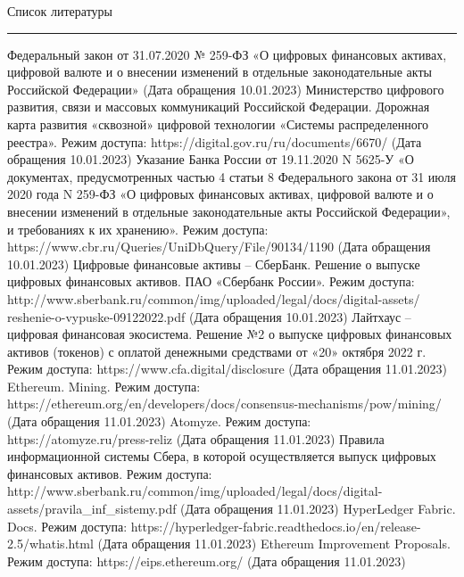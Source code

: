 \makeatletter
\renewcommand\@biblabel[1]{#1.}
\makeatother

Список литературы
\hrule height 2pt

\renewcommand{\refname}{}
\vspace{-\baselineskip}
\begin{thebibliography}{10}
	 Федеральный закон от 31.07.2020 № 259-ФЗ «О цифровых финансовых активах, цифровой валюте и о внесении изменений в отдельные законодательные акты Российской Федерации» (Дата обращения 10.01.2023)
	 Министерство цифрового развития, связи и массовых коммуникаций Российской Федерации. Дорожная карта развития «сквозной» цифровой технологии «Системы распределенного реестра». Режим доступа: https://digital.gov.ru/ru/documents/6670/ (Дата обращения 10.01.2023)
	 Указание Банка России от 19.11.2020 N 5625-У «О документах, предусмотренных частью 4 статьи 8 Федерального закона от 31 июля 2020 года N 259-ФЗ «О цифровых финансовых активах, цифровой валюте и о внесении изменений в отдельные законодательные акты Российской Федерации», и требованиях к их хранению». Режим доступа: https://www.cbr.ru/Queries/UniDbQuery/File/90134/1190 (Дата обращения 10.01.2023)
	 Цифровые финансовые активы – СберБанк. Решение о выпуске цифровых финансовых активов. ПАО «Сбербанк России». Режим доступа: http://www.sberbank.ru/common/img/uploaded/legal/docs/digital-assets/ reshenie-o-vypuske-09122022.pdf (Дата обращения 10.01.2023)
	 Лайтхаус – цифровая финансовая экосистема. Решение №2 о выпуске цифровых финансовых активов (токенов) с оплатой денежными средствами от «20» октября 2022 г. Режим доступа: https://www.cfa.digital/disclosure (Дата обращения 11.01.2023)
	 Ethereum. Mining. Режим доступа: https://ethereum.org/en/developers/docs/consensus-mechanisms/pow/mining/ (Дата обращения 11.01.2023)
	 Atomyze. Режим доступа: https://atomyze.ru/press-reliz (Дата обращения 11.01.2023)
	 Правила информационной системы Сбера, в которой осуществляется выпуск цифровых финансовых активов. Режим доступа: http://www.sberbank.ru/common/img/uploaded/legal/docs/digital-assets/pravila\_inf\_sistemy.pdf (Дата обращения 11.01.2023)
	 HyperLedger Fabric. Docs. Режим доступа: https://hyperledger-fabric.readthedocs.io/en/release-2.5/whatis.html (Дата обращения 11.01.2023)
	 Ethereum Improvement Proposals. Режим доступа: https://eips.ethereum.org/ (Дата обращения 11.01.2023)
\end{thebibliography}

